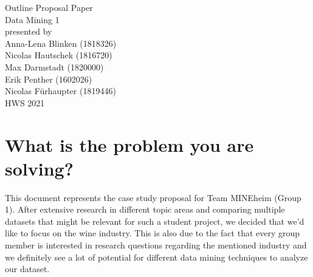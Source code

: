 \documentclass[11pt,titlepage,oneside,openany]{article}
\begin{document}
\begin{titlepage}
	\vspace*{2cm}
  \begin{center}
   {\Large Outline Proposal Paper\\}
   \vspace{2cm} 
   {Data Mining 1\\}
   \vspace{2cm}
   {presented by\\
    Anna-Lena Blinken (1818326)\\
	Nicolas Hautschek (1816720)\\
	Max Darmstadt (1820000)\\
	Erik Penther (1602026)\\
	Nicolas Fürhaupter (1819446)\\
   }
   \vspace{1cm} 
   {HWS 2021}
  \end{center}
\end{titlepage} 






\newpage



\section{What is the problem you are solving?}

This document represents the case study proposal for Team MINEheim (Group 1). After extensive research in different topic areas and comparing multiple datasets that might be relevant for such a student project, we decided that we’d like to focus on the wine industry. This is also due to the fact that every group member is interested in research questions regarding the mentioned industry and we definitely see a lot of potential for different data mining techniques to analyze our dataset.
\end{document}
